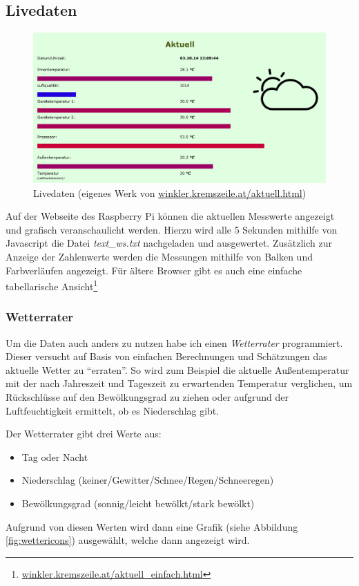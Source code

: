 \subsection{Livedaten}
\label{subsec:Livedaten}

\begin{figure}[h]
  \centering
     \includegraphics[width=\textwidth]{figures/aktuell.png}
  \caption{Livedaten (eigenes Werk von \href{http://winkler.kremszeile.at/aktuell.html}{winkler.kremszeile.at/aktuell.html})}
  \label{fig:display_neu}
\end{figure}

Auf der Webseite des Raspberry Pi können die aktuellen Messwerte angezeigt und grafisch veranschaulicht werden. Hierzu wird alle 5 Sekunden mithilfe von \gls{Javascript} die Datei \emph{text\_ws.txt} nachgeladen und ausgewertet. Zusätzlich zur Anzeige der Zahlenwerte werden die Messungen mithilfe von Balken und Farbverläufen angezeigt. Für ältere Browser gibt es auch eine einfache tabellarische Ansicht\footnote{\href{http://winkler.kremszeile.at/aktuell_einfach.html}{winkler.kremszeile.at/aktuell\_einfach.html}}

\subsubsection{Wetterrater}
\label{subsubsec:Wetterrater}

Um die Daten auch anders zu nutzen habe ich einen \emph{Wetterrater} programmiert. Dieser versucht auf Basis von einfachen Berechnungen und Schätzungen das aktuelle Wetter zu \enquote{erraten}. So wird zum Beispiel die aktuelle Außentemperatur mit der nach Jahreszeit und Tageszeit zu erwartenden Temperatur verglichen, um Rückschlüsse auf den Bewölkungsgrad zu ziehen oder aufgrund der Luftfeuchtigkeit ermittelt, ob es Niederschlag gibt.

Der Wetterrater gibt drei Werte aus:
\begin{itemize}
	\item Tag oder Nacht
	\item Niederschlag (keiner/Gewitter/Schnee/Regen/Schneeregen)
	\item Bewölkungsgrad (sonnig/leicht bewölkt/stark bewölkt)
\end{itemize}
Aufgrund von diesen Werten wird dann eine Grafik (siehe Abbildung \ref{fig:wettericons}) ausgewählt, welche dann angezeigt wird.


